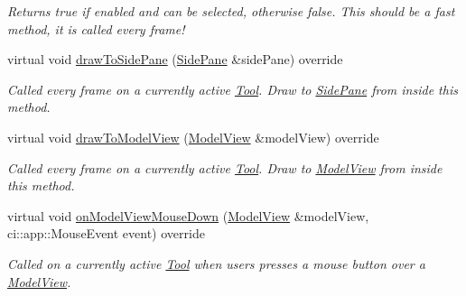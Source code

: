 \begin{DoxyCompactItemize}
\begin{DoxyCompactList}\small\item\em Returns true if enabled and can be selected, otherwise false. This should be a fast method, it is called every frame! \end{DoxyCompactList}\item 
\mbox{\label{classpepr3d_1_1_brush_a0f0e98b2326e88fa5b6a3cbeaeb9b3b1}} 
virtual void \mbox{\hyperlink{classpepr3d_1_1_brush_a0f0e98b2326e88fa5b6a3cbeaeb9b3b1}{draw\+To\+Side\+Pane}} (\mbox{\hyperlink{classpepr3d_1_1_side_pane}{Side\+Pane}} \&side\+Pane) override
\begin{DoxyCompactList}\small\item\em Called every frame on a currently active \mbox{\hyperlink{classpepr3d_1_1_tool}{Tool}}. Draw to \mbox{\hyperlink{classpepr3d_1_1_side_pane}{Side\+Pane}} from inside this method. \end{DoxyCompactList}\item 
\mbox{\label{classpepr3d_1_1_brush_a88cb183b963bd9e4e5082fcbe50bdcd1}} 
virtual void \mbox{\hyperlink{classpepr3d_1_1_brush_a88cb183b963bd9e4e5082fcbe50bdcd1}{draw\+To\+Model\+View}} (\mbox{\hyperlink{classpepr3d_1_1_model_view}{Model\+View}} \&model\+View) override
\begin{DoxyCompactList}\small\item\em Called every frame on a currently active \mbox{\hyperlink{classpepr3d_1_1_tool}{Tool}}. Draw to \mbox{\hyperlink{classpepr3d_1_1_model_view}{Model\+View}} from inside this method. \end{DoxyCompactList}\item 
\mbox{\label{classpepr3d_1_1_brush_a9222fa4ba78b38f7b37767dfe8d26b67}} 
virtual void \mbox{\hyperlink{classpepr3d_1_1_brush_a9222fa4ba78b38f7b37767dfe8d26b67}{on\+Model\+View\+Mouse\+Down}} (\mbox{\hyperlink{classpepr3d_1_1_model_view}{Model\+View}} \&model\+View, ci\+::app\+::\+Mouse\+Event event) override
\begin{DoxyCompactList}\small\item\em Called on a currently active \mbox{\hyperlink{classpepr3d_1_1_tool}{Tool}} when users presses a mouse button over a \mbox{\hyperlink{classpepr3d_1_1_model_view}{Model\+View}}. \end{DoxyCompactList}\item 

\end{DoxyCompactItemize}
